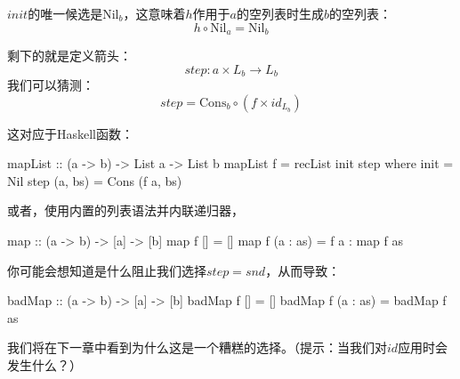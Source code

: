 \documentclass[DaoFP]{subfiles}
\begin{document}
$\mathit{init}$的唯一候选是$\text{Nil}_b$，这意味着$h$作用于$a$的空列表时生成$b$的空列表：
\[ h \circ \text{Nil}_a = \text{Nil}_b \]

剩下的就是定义箭头：
\[\mathit{step} \colon a \times L_b \to L_b\]
我们可以猜测：
\[ \mathit{step} = \text{Cons}_b \circ (f \times id_{L_b}) \]

这对应于Haskell函数：

\begin{haskell}
mapList :: (a -> b) -> List a -> List b
mapList f = recList init step
  where
    init = Nil
    step (a, bs) = Cons (f a, bs)
\end{haskell}
或者，使用内置的列表语法并内联递归器，
\begin{haskell}
map :: (a -> b) -> [a] -> [b]
map f [] = []
map f (a : as) = f a : map f as
\end{haskell}

你可能会想知道是什么阻止我们选择$\mathit{step} = \mathit{snd}$，从而导致：
\begin{haskell}
badMap :: (a -> b) -> [a] -> [b]
badMap f [] = []
badMap f (a : as) = badMap f as
\end{haskell}
我们将在下一章中看到为什么这是一个糟糕的选择。（提示：当我们对$id$应用时会发生什么？）
\end{document}
